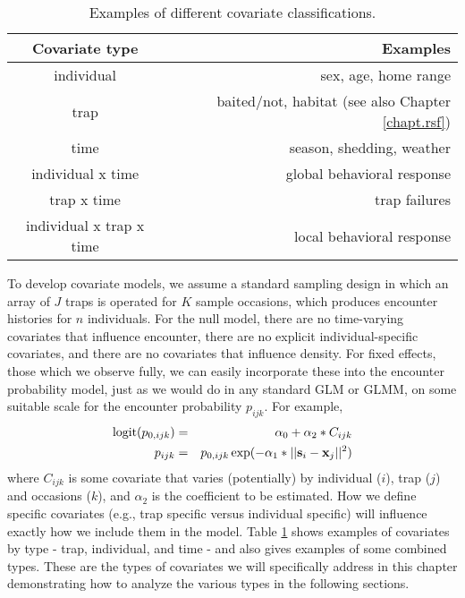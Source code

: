 \begin{table}[ht]
\centering
\caption{Examples of different covariate classifications.}
\begin{tabular}{cr}
\hline
Covariate type & Examples \\
\hline
individual & sex, age, home range \\
trap  &  baited/not, habitat (see also Chapter \ref{chapt.rsf}) \\
time  &  season, shedding,  weather  \\
individual x time    &    global behavioral response \\
trap x time     &       trap failures  \\ 
individual x trap x time  &   local behavioral response  \\
\end{tabular}
\label{covariates.tab.covclass}
\end{table}


To develop covariate models, we assume a standard sampling design in which an
array of $J$ traps is operated for $K$ sample occasions, which produces
encounter histories for $n$ individuals.  For the null model, there
are no time-varying covariates that influence encounter, there are no
explicit individual-specific covariates, and there are no covariates
that influence density.  For fixed effects, those which we observe
fully, we can easily incorporate these into the encounter probability
model, just as we would do in any standard GLM or GLMM, on some
suitable scale for the encounter probability $p_{ijk}$. For example,
\begin{eqnarray*}
\mbox{logit}(p_{0,ijk}) &=& \alpha_0 + \alpha_2*C_{ijk} \\
p_{ijk} &=& p_{0,ijk} \exp(- \alpha_1*||{\bf s}_{i}-{\bf x}_{j}||^2) 
\end{eqnarray*}
where $C_{ijk}$ is some covariate that varies (potentially) by
individual ($i$), trap ($j$) and occasions ($k$), and
$\alpha_2$ is the coefficient to be estimated.
 How we define specific covariates (e.g., trap specific
versus individual specific) will influence exactly how we include them
in the model. Table \ref{covariates.tab.covclass} shows examples of covariates by
type - trap, individual, and time - and also gives examples of some combined types.
These are the types of covariates we will specifically address in this chapter demonstrating
how to analyze the various types in the following sections.  

